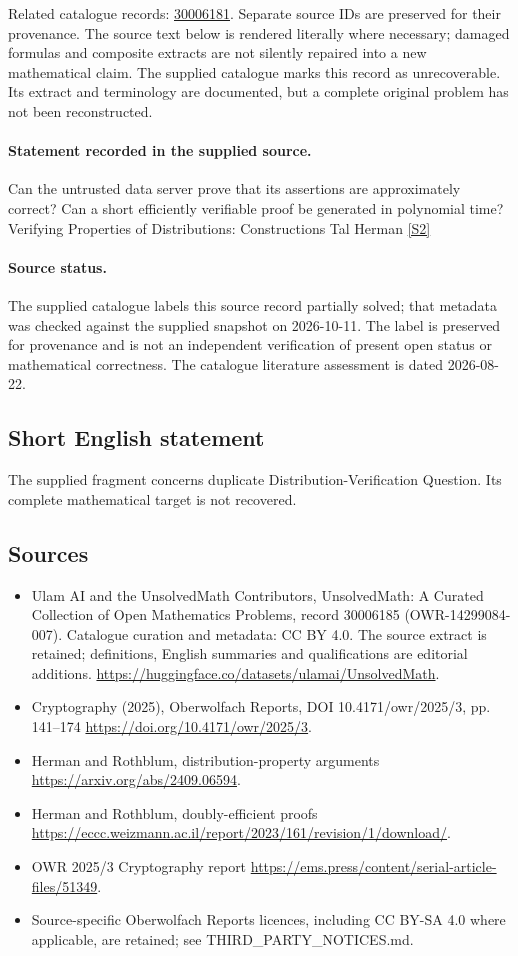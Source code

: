 \documentclass[11pt]{article}
\begin{document}
Related catalogue records: \href{https://mehmetmars7.github.io/Erdosproblems-llm-hunter/problem.html?type=open_problems&id=30006181}{30006181}. Separate source IDs are preserved for their provenance.
The source text below is rendered literally where necessary; damaged formulas and composite extracts are not silently repaired into a new mathematical claim.
The supplied catalogue marks this record as unrecoverable. Its extract and terminology are documented, but a complete original problem has not been reconstructed.
\paragraph{Statement recorded in the supplied source.}
Can the untrusted data server prove that its assertions are approximately correct? Can a short efficiently verifiable proof be generated in polynomial time? Verifying Properties of Distributions: Constructions Tal Herman \href{https://doi.org/10.4171/owr/2025/3}{[S2]}
\paragraph{Source status.}
The supplied catalogue labels this source record partially solved; that metadata was checked against the supplied snapshot on 2026-10-11. The label is preserved for provenance and is not an independent verification of present open status or mathematical correctness. The catalogue literature assessment is dated 2026-08-22.
\subsection{Short English statement}
The supplied fragment concerns duplicate Distribution-Verification Question. Its complete mathematical target is not recovered.
\subsection{Sources}
\begin{itemize}
\item[S1] Ulam AI and the UnsolvedMath Contributors, UnsolvedMath: A Curated Collection of Open Mathematics Problems, record 30006185 (OWR-14299084-007). Catalogue curation and metadata: CC BY 4.0. The source extract is retained; definitions, English summaries and qualifications are editorial additions.
\url{https://huggingface.co/datasets/ulamai/UnsolvedMath}.
\item[S2] Cryptography (2025), Oberwolfach Reports, DOI 10.4171/owr/2025/3, pp. 141--174
\url{https://doi.org/10.4171/owr/2025/3}.
\item[S3] Herman and Rothblum, distribution-property arguments
\url{https://arxiv.org/abs/2409.06594}.
\item[S4] Herman and Rothblum, doubly-efficient proofs
\url{https://eccc.weizmann.ac.il/report/2023/161/revision/1/download/}.
\item[S5] OWR 2025/3 Cryptography report
\url{https://ems.press/content/serial-article-files/51349}.
\item Source-specific Oberwolfach Reports licences, including CC BY-SA 4.0 where applicable, are retained; see THIRD\_PARTY\_NOTICES.md.
\end{itemize}
\end{document}
